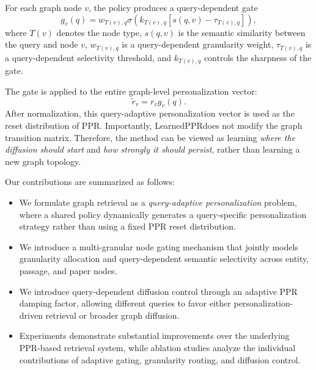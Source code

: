 \documentclass[conference]{IEEEtran}
\newcommand{\method}{LearnedPPR}
\newcommand{\q}{q}
\newcommand{\reset}{r}
\newcommand{\gatedreset}{\tilde r}
\begin{document}
For each graph node $v$, the policy produces a query-dependent gate
\begin{equation}
g_v(\q)
=
w_{T(v),\q}
\sigma
\left(
k_{T(v),\q}
\left[
s(\q,v)-\tau_{T(v),\q}
\right]
\right),
\label{eq:gate}
\end{equation}
where $T(v)$ denotes the node type, $s(\q,v)$ is the semantic
similarity between the query and node $v$, $w_{T(v),\q}$ is a
query-dependent granularity weight, $\tau_{T(v),\q}$ is a
query-dependent selectivity threshold, and $k_{T(v),\q}$ controls the
sharpness of the gate.

The gate is applied to the entire graph-level personalization vector:
\begin{equation}
\gatedreset_v
=
\reset_v g_v(\q).
\label{eq:gated-reset}
\end{equation}
After normalization, this query-adaptive personalization vector is
used as the reset distribution of PPR. Importantly, \method does not
modify the graph transition matrix. Therefore, the method can be
viewed as learning \emph{where the diffusion should start} and
\emph{how strongly it should persist}, rather than learning a new
graph topology.

Our contributions are summarized as follows:

\begin{itemize}
    \item We formulate graph retrieval as a
    \emph{query-adaptive personalization} problem, where a shared
    policy dynamically generates a query-specific personalization
    strategy rather than using a fixed PPR reset distribution.

    \item We introduce a multi-granular node gating mechanism that
    jointly models granularity allocation and query-dependent
    semantic selectivity across entity, passage, and paper nodes.

    \item We introduce query-dependent diffusion control through an
    adaptive PPR damping factor, allowing different queries to favor
    either personalization-driven retrieval or broader graph
    diffusion.

    \item Experiments demonstrate substantial improvements over the
    underlying PPR-based retrieval system, while ablation studies
    analyze the individual contributions of adaptive gating,
    granularity routing, and diffusion control.
\end{itemize}
\end{document}
